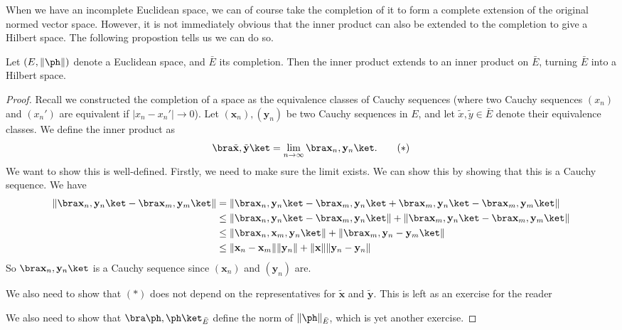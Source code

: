 \documentclass[a4paper]{article}
\begin{document}
When we have an incomplete Euclidean space, we can of course take the completion of it to form a complete extension of the original normed vector space. However, it is not immediately obvious that the inner product can also be extended to the completion to give a Hilbert space. The following propostion tells us we can do so.
\begin{prop}
  Let $(E, \|\ph\|)$ denote a Euclidean space, and $\bar{E}$ its completion. Then the inner product extends to an inner product on $\bar{E}$, turning $\bar{E}$ into a Hilbert space.
\end{prop}

\begin{proof}
  Recall we constructed the completion of a space as the equivalence classes of Cauchy sequences (where two Cauchy sequences $(x_n)$ and $(x_n')$ are equivalent if $|x_n - x_n'| \to 0$). Let $(\mathbf{x}_n), (\mathbf{y}_n)$ be two Cauchy sequences in $E$, and let $\tilde{x}, \tilde{y} \in \bar{E}$ denote their equivalence classes. We define the inner product as
  \[
    \bra \tilde{\mathbf{x}}, \tilde{\mathbf{y}}\ket = \lim_{n \to \infty} \bra \mathbf{x}_n,\mathbf{y}_n\ket.\tag{$*$}
  \]
  We want to show this is well-defined. Firstly, we need to make sure the limit exists. We can show this by showing that this is a Cauchy sequence. We have
  \begin{align*}
    \|\bra \mathbf{x}_n, \mathbf{y}_n\ket - \bra \mathbf{x}_m, \mathbf{y}_m \ket\| &= \|\bra \mathbf{x}_n, \mathbf{y}_n\ket - \bra \mathbf{x}_m, \mathbf{y}_n\ket + \bra \mathbf{x}_m, \mathbf{y}_n\ket - \bra \mathbf{x}_m, \mathbf{y}_m\ket\|\\
    &\leq \|\bra \mathbf{x}_n, \mathbf{y}_n\ket - \bra \mathbf{x}_m, \mathbf{y}_n\ket \| + \|\bra \mathbf{x}_m, \mathbf{y}_n\ket - \bra \mathbf{x}_m, \mathbf{y}_m\ket\|\\
    &\leq \|\bra \mathbf{x}_n, \mathbf{x}_m, \mathbf{y}_n\ket \| + \|\bra \mathbf{x}_m, \mathbf{y}_n - \mathbf{y}_m\ket\|\\
    &\leq \|\mathbf{x}_n - \mathbf{x}_m\| \|\mathbf{y}_n\| + \|\mathbf{x}\|\|\mathbf{y}_n - \mathbf{y}_n\|
  \end{align*}
  So $\bra \mathbf{x}_n, \mathbf{y}_n\ket$ is a Cauchy sequence since $(\mathbf{x}_n)$ and $(\mathbf{y}_n)$ are.

  We also need to show that $(*)$ does not depend on the representatives for $\tilde{\mathbf{x}}$ and $\tilde{\mathbf{y}}$. This is left as an exercise for the reader %

  We also need to show that $\bra \ph, \ph\ket_{\bar{E}}$ define the norm of $\|\ph \|_{\bar{E}}$, which is yet another exercise. %
\end{proof}
\end{document}
